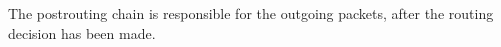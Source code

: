 The postrouting chain is responsible for the outgoing packets, after the routing decision has been made.